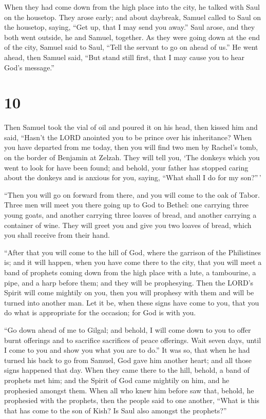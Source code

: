  When they had come down from the high place into the
city, he talked with Saul on the housetop.  They arose
early; and about daybreak, Samuel called to Saul on the housetop,
saying, ``Get up, that I may send you away.'' Saul arose, and they both
went outside, he and Samuel, together.  As they were
going down at the end of the city, Samuel said to Saul, ``Tell the
servant to go on ahead of us.'' He went ahead, then Samuel said, ``But
stand still first, that I may cause you to hear God's message.''

\hypertarget{section-9}{%
\section{10}\label{section-9}}

 Then Samuel took the vial of oil and poured it on his
head, then kissed him and said, ``Hasn't the LORD anointed you to be
prince over his inheritance?  When you have departed from
me today, then you will find two men by Rachel's tomb, on the border of
Benjamin at Zelzah. They will tell you, `The donkeys which you went to
look for have been found; and behold, your father has stopped caring
about the donkeys and is anxious for you, saying, ``What shall I do for
my son?''\,'

 ``Then you will go on forward from there, and you will
come to the oak of Tabor. Three men will meet you there going up to God
to Bethel: one carrying three young goats, and another carrying three
loaves of bread, and another carrying a container of wine.
 They will greet you and give you two loaves of bread,
which you shall receive from their hand.

 ``After that you will come to the hill of God, where the
garrison of the Philistines is; and it will happen, when you have come
there to the city, that you will meet a band of prophets coming down
from the high place with a lute, a tambourine, a pipe, and a harp before
them; and they will be prophesying.  Then the LORD's
Spirit will come mightily on you, then you will prophesy with them and
will be turned into another man.  Let it be, when these
signs have come to you, that you do what is appropriate for the
occasion; for God is with you.

 ``Go down ahead of me to Gilgal; and behold, I will come
down to you to offer burnt offerings and to sacrifice sacrifices of
peace offerings. Wait seven days, until I come to you and show you what
you are to do.''  It was so, that when he had turned his
back to go from Samuel, God gave him another heart; and all those signs
happened that day.  When they came there to the hill,
behold, a band of prophets met him; and the Spirit of God came mightily
on him, and he prophesied amongst them.  When all who
knew him before saw that, behold, he prophesied with the prophets, then
the people said to one another, ``What is this that has come to the son
of Kish? Is Saul also amongst the prophets?''

